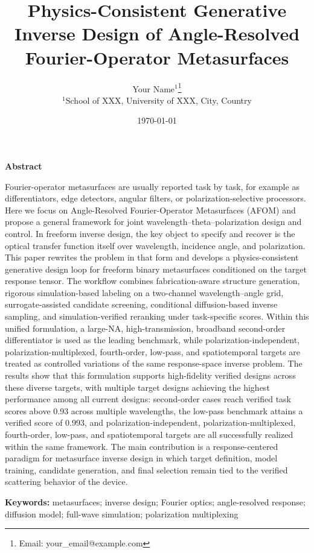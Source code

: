 \documentclass[10pt,a4paper]{article}
\renewenvironment{abstract}{%
  \begin{center}%
    \bfseries Abstract
  \end{center}%
  \par
  \setlength{\parindent}{2em}%
}{\par}
\begin{document}
\title{Physics-Consistent Generative Inverse Design of Angle-Resolved Fourier-Operator Metasurfaces}

\author{%
Your Name$^{1}$\thanks{Email: your\_email@example.com} \\
\small $^{1}$School of XXX, University of XXX, City, Country%
}

\date{\today}

\maketitle

\begin{abstract}
Fourier-operator metasurfaces are usually reported task by task, for example as differentiators, edge detectors, angular filters, or polarization-selective processors. Here we focus on Angle-Resolved Fourier-Operator Metasurfaces (AFOM) and propose a general framework for joint wavelength--theta--polarization design and control. In freeform inverse design, the key object to specify and recover is the optical transfer function itself over wavelength, incidence angle, and polarization. This paper rewrites the problem in that form and develops a physics-consistent generative design loop for freeform binary metasurfaces conditioned on the target response tensor. The workflow combines fabrication-aware structure generation, rigorous simulation-based labeling on a two-channel wavelength--angle grid, surrogate-assisted candidate screening, conditional diffusion-based inverse sampling, and simulation-verified reranking under task-specific scores. Within this unified formulation, a large-NA, high-transmission, broadband second-order differentiator is used as the leading benchmark, while polarization-independent, polarization-multiplexed, fourth-order, low-pass, and spatiotemporal targets are treated as controlled variations of the same response-space inverse problem. The results show that this formulation supports high-fidelity verified designs across these diverse targets, with multiple target designs achieving the highest performance among all current designs: second-order cases reach verified task scores above 0.93 across multiple wavelengths, the low-pass benchmark attains a verified score of 0.993, and polarization-independent, polarization-multiplexed, fourth-order, low-pass, and spatiotemporal targets are all successfully realized within the same framework. The main contribution is a response-centered paradigm for metasurface inverse design in which target definition, model training, candidate generation, and final selection remain tied to the verified scattering behavior of the device.

\vspace{0.5em}
\noindent\textbf{Keywords:} metasurfaces; inverse design; Fourier optics; angle-resolved response; diffusion model; full-wave simulation; polarization multiplexing
\end{abstract}









\end{document}
